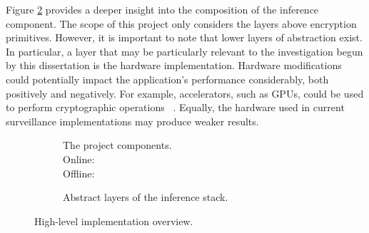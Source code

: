 \indent \indent
Figure \ref{fig:abstractInference} provides a deeper insight into the composition of the inference component. The scope of this project only considers the layers above encryption primitives. However, it is important to note that lower layers of abstraction exist. In particular, a layer that may be particularly relevant to the investigation begun by this dissertation is the hardware implementation. Hardware modifications could potentially impact the application's performance considerably, both positively and negatively. For example, accelerators, such as GPUs, could be used to perform cryptographic operations ~\cite{Badawi}. Equally, the hardware used in current surveillance implementations may produce weaker results.
\begin{figure}[ht]
    \begin{subfigure}[b]{0.5\textwidth}
        \centering
        \scalebox{0.5}{}
        \captionsetup{justification=centering}
        \caption[Project Components]{The project components.\medskip\\Online: \hl{\quad\quad\quad\quad}\smallskip\\Offline: \hl{\quad\quad\quad\quad}}
        \label{fig:abstractNetwork}
    \end{subfigure}%
    \begin{subfigure}[b]{0.5\textwidth}
        \centering
        \scalebox{0.7}{}
        \caption{Abstract layers of the inference stack.}
        \label{fig:abstractInference}
    \end{subfigure}%
    \caption{High-level implementation overview.}
    \label{fig:abstraction}
\end{figure}

\setlength{\leftskip}{0cm}
